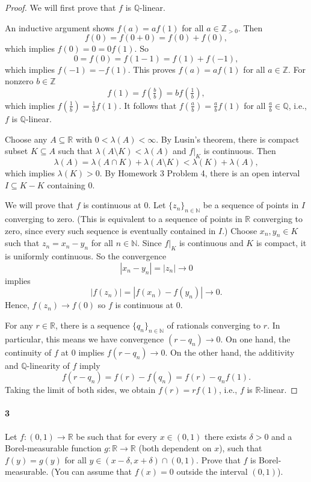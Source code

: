\documentclass[12pt]{article}
\newlength{\myparskip}
\newenvironment{fullbox}{\begin{lrbox}{\savefullbox}\begin{minipage}{\dimexpr\textwidth-2\fboxsep\relax}\setlength{\parskip}{\myparskip}}{\end{minipage}\end{lrbox}\framebox[\textwidth]{\usebox{\savefullbox}}}
\newenvironment{pbox}[1][]{\begin{fullbox}\ifx#1\empty\else\paragraph{#1}\fi}{\end{fullbox}}
\theoremstyle{definition}
\newcommand{\N}{\mathbb{N}}
\newcommand{\Z}{\mathbb{Z}}
\newcommand{\Q}{\mathbb{Q}}
\newcommand{\R}{\mathbb{R}}
\newcommand{\<}{\langle}
\renewcommand{\>}{\rangle}
\begin{document}
\begin{proof}
    We will first prove that $f$ is $\Q$-linear.

    An inductive argument shows $f(a) = af(1)$ for all $a \in \Z_{>0}$. Then
    \[
        f(0) = f(0 + 0) = f(0) + f(0),
    \]
    which implies $f(0) = 0 = 0f(1)$. So
    \[
        0 = f(0) = f(1 - 1) = f(1) + f(-1),
    \]
    which implies $f(-1) = -f(1)$. This proves $f(a) = af(1)$ for all $a \in \Z$. For nonzero $b \in \Z$
    \[
        f(1) = f(\tfrac{b}{b}) = bf(\tfrac{1}{b}),
    \]
    which implies $f(\tfrac{1}{b}) = \tfrac{1}{b}f(1)$. It follows that $f(\tfrac{a}{b}) = \tfrac{a}{b}f(1)$ for all $\tfrac{a}{b} \in \Q$, i.e., $f$ is $\Q$-linear.

    Choose any $A \subseteq \R$ with $0 < \lambda(A) < \infty$. By Lusin's theorem, there is compact subset $K \subseteq A$ such that $\lambda(A \setminus K) < \lambda(A)$ and $f|_K$ is continuous. Then
    \[
        \lambda(A)
            = \lambda(A \cap K) + \lambda(A \setminus K)
            < \lambda(K) + \lambda(A),
    \]
    which implies $\lambda(K) > 0$. By Homework 3 Problem 4, there is an open interval $I \subseteq K - K$ containing $0$.

    We will prove that $f$ is continuous at $0$. Let $\{z_n\}_{n \in \N}$ be a sequence of points in $I$ converging to zero. (This is equivalent to a sequence of points in $\R$ converging to zero, since every such sequence is eventually contained in $I$.) Choose $x_n, y_n \in K$ such that $z_n = x_n - y_n$ for all $n \in \N$. Since $f|_K$ is continuous and $K$ is compact, it is uniformly continuous. So the convergence
    \[
        |x_n - y_n| = |z_n| \longrightarrow 0
    \]
    implies
    \[
        |f(z_n)| = |f(x_n) - f(y_n)| \longrightarrow 0.
    \]
    Hence, $f(z_n) \to f(0)$ so $f$ is continuous at $0$.

    For any $r \in \R$, there is a sequence $\{q_n\}_{n \in \N}$ of rationals converging to $r$. In particular, this means we have convergence $(r - q_n) \to 0$. On one hand, the continuity of $f$ at $0$ implies $f(r - q_n) \to 0$. On the other hand, the additivity and $\Q$-linearity of $f$ imply
    \[
        f(r - q_n) = f(r) - f(q_n) = f(r) - q_nf(1).
    \]
    Taking the limit of both sides, we obtain $f(r) = rf(1)$, i.e., $f$ is $\R$-linear.
\end{proof}


\begin{pbox}[3]
    Let $f : (0, 1) \to \R$ be such that for every $x \in (0, 1)$ there exists $\delta > 0$ and a Borel-measurable function $g : \R \to \R$ (both dependent on $x$), such that $f(y) = g(y)$ for all $y \in (x - \delta, x + \delta) \cap (0, 1)$. Prove that $f$ is Borel-measurable. (You can assume that $f(x) = 0$ outside the interval $(0, 1)$).
\end{pbox}
\end{document}
